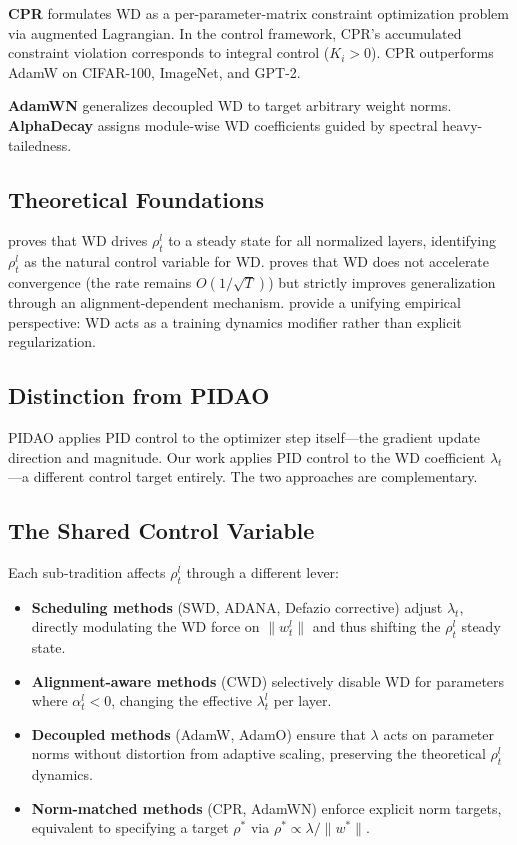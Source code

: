 \documentclass{article}
\begin{document}
\textbf{CPR} \citep{franke2024cpr} formulates WD as a per-parameter-matrix constraint optimization problem via augmented Lagrangian. In the control framework, CPR's accumulated constraint violation corresponds to integral control ($K_i > 0$). CPR outperforms AdamW on CIFAR-100, ImageNet, and GPT-2.

\textbf{AdamWN} \citep{loshchilov2023adamwn} generalizes decoupled WD to target arbitrary weight norms. \textbf{AlphaDecay} \citep{he2025alphadecay} assigns module-wise WD coefficients guided by spectral heavy-tailedness.

\subsection{Theoretical Foundations}

\citet{defazio2025gw} proves that WD drives $\rho_t^l$ to a steady state for all normalized layers, identifying $\rho_t^l$ as the natural control variable for WD. \citet{sun2025wd} proves that WD does not accelerate convergence (the rate remains $O(1/\sqrt{T})$) but strictly improves generalization through an alignment-dependent mechanism. \citet{dangelo2024wd} provide a unifying empirical perspective: WD acts as a training dynamics modifier rather than explicit regularization.

\subsection{Distinction from PIDAO}

PIDAO \citep{pidao2024} applies PID control to the optimizer step itself---the gradient update direction and magnitude. Our work applies PID control to the WD coefficient $\lambda_t$---a different control target entirely. The two approaches are complementary.

\subsection{The Shared Control Variable}

Each sub-tradition affects $\rho_t^l$ through a different lever:
\begin{itemize}
\item \textbf{Scheduling methods} (SWD, ADANA, Defazio corrective) adjust $\lambda_t$, directly modulating the WD force on $\|w_t^l\|$ and thus shifting the $\rho_t^l$ steady state.
\item \textbf{Alignment-aware methods} (CWD) selectively disable WD for parameters where $\alpha_t^l < 0$, changing the effective $\lambda_t^l$ per layer.
\item \textbf{Decoupled methods} (AdamW, AdamO) ensure that $\lambda$ acts on parameter norms without distortion from adaptive scaling, preserving the theoretical $\rho_t^l$ dynamics.
\item \textbf{Norm-matched methods} (CPR, AdamWN) enforce explicit norm targets, equivalent to specifying a target $\rho^*$ via $\rho^* \propto \lambda / \|w^*\|$.
\end{itemize}
\end{document}
